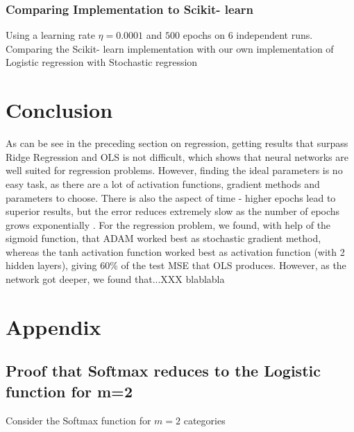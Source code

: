 \documentclass[11pt,a4paper,titlepage]{article}
\begin{document}
\subsubsection{Comparing Implementation to Scikit- learn}
Using a learning rate $\eta = 0.0001$ and $500$ epochs on $6$ independent runs. Comparing the Scikit- learn implementation with our own implementation of Logistic regression with Stochastic regression


\section{Conclusion}
As can be see in the preceding section on regression, getting results that surpass Ridge Regression and OLS is not difficult, which shows that neural networks are well suited for regression problems. However, finding the ideal parameters is no easy task, as there are a lot of activation functions, gradient methods and parameters to choose. There is also the aspect of time - higher epochs lead to superior results, but the error reduces extremely slow as the number of epochs grows exponentially \citep{handsOnMachineLearning}. For the regression problem, we found, with help of the sigmoid function, that ADAM worked best as stochastic gradient method, whereas the tanh activation function worked best as activation function (with 2 hidden layers), giving $60\%$ of the test MSE that OLS produces. However, as the network got deeper, we found that...XXX blablabla
\section{Appendix}
\subsection{Proof that Softmax reduces to the Logistic function for m=2}\label{ProofSoftmaxToLogistic}

Consider the Softmax function for $m=2$ categories
\end{document}

